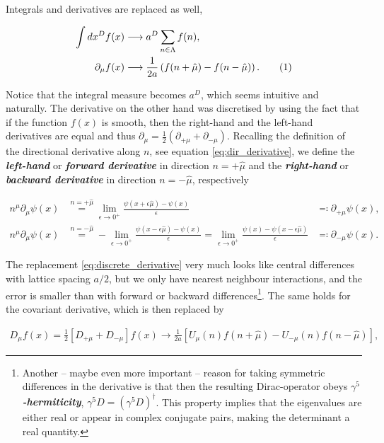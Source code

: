 \documentclass{article}
\newcommand\numberthis{\addtocounter{equation}{1}\tag{\theequation}}
\theoremstyle{plain} %
\theoremstyle{convention} %
\theoremstyle{remark} %
\def\df#1{\textbf{\textit{#1}}}
\numberwithin{equation}{section}
\begin{document}
Integrals and derivatives are replaced as well,

\begin{align*}
    \int dx^D f(x) &\longrightarrow a^D \sum_{n \in \Lambda} f(n), \\
    \partial_{\mu} f(x) &\longrightarrow \frac{1}{2a} \left( f(n+\hat{\mu}) - f(n-\hat{\mu}) \right). \numberthis \label{eq:discrete_derivative}
\end{align*}

Notice that the integral measure becomes $a^D$, which seems intuitive and naturally. The derivative on the other hand was discretised by using the fact that if the function $f(x)$ is smooth, then the right-hand and the left-hand derivatives are equal and thus $\partial_{\mu} = \frac{1}{2}(\partial_{+\mu} + \partial_{-\mu})$. Recalling the definition of the directional derivative along $n$, see equation \eqref{eq:dir_derivative}, we define the \df{left-hand} or \df{forward derivative} in direction $n=+\hat{\mu}$ and the \df{right-hand} or \df{backward derivative} in direction $n=-\hat{\mu}$, respectively

\begin{align*}
    n^{\mu} \partial_{\mu} \psi(x) &\stackrel{n = +\hat{\mu}}{=} \lim_{\epsilon \to 0^{+}} \frac{ \psi(x + \epsilon \hat{\mu}) - \psi(x) }{\epsilon} &\eqqcolon \partial_{+\mu} \psi(x), \\
    n^{\mu} \partial_{\mu} \psi(x) &\stackrel{n = -\hat{\mu}}{=} - \lim_{\epsilon \to 0^{+}} \frac{ \psi(x - \epsilon \hat{\mu}) - \psi(x) }{\epsilon} = \lim_{\epsilon \to 0^{+}} \frac{ \psi(x) - \psi(x - \epsilon \hat{\mu}) }{\epsilon} &\eqqcolon \partial_{-\mu} \psi(x).
\end{align*}


The replacement \eqref{eq:discrete_derivative} very much looks like central differences with lattice spacing $a/2$, but we only have nearest neighbour interactions, and the error is smaller than with forward or backward differences\footnote{Another -- maybe even more important -- reason for taking symmetric differences in the derivative is that then the resulting Dirac-operator obeys \df{$\gamma^5$-hermiticity}, $\gamma^5 D = (\gamma^5 D)^{\dagger}$. This property implies that the eigenvalues are either real or appear in complex conjugate pairs, making the determinant a real quantity.}. The same holds for the covariant derivative, which is then replaced by

\begin{align*}
    D_{\mu} f(x) = \frac{1}{2} \left[ D_{+\mu} + D_{-\mu} \right] f(x) \longrightarrow \frac{1}{2a} \left[ U_{\mu}(n) f(n+\hat{\mu}) - U_{-\mu}(n) f(n-\hat{\mu}) \right],
\end{align*}
\end{document}
